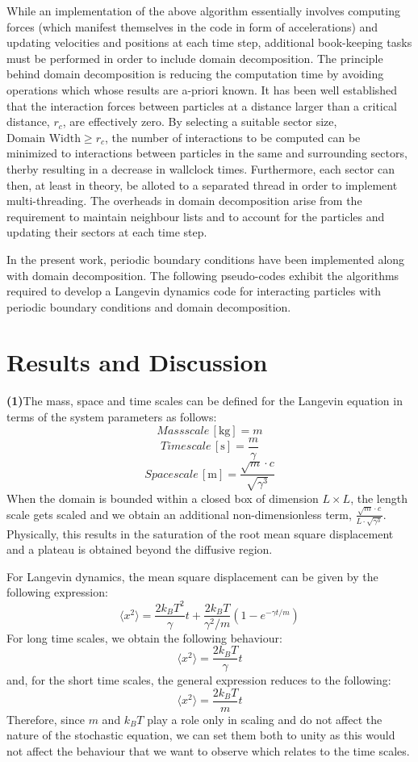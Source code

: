 \documentclass[11pt, oneside]{article}
\begin{document}
While an implementation of the above algorithm essentially involves computing forces (which manifest themselves in the code in form of accelerations) and updating velocities and positions at each time step, additional book-keeping tasks must be performed in order to include domain decomposition. The principle behind domain decomposition is reducing the computation time by avoiding operations which whose results are a-priori known. It has been well established that the interaction forces between particles at a distance larger than a critical distance, $r_c$, are effectively zero. By selecting a suitable sector size, $\text{Domain Width} \geq r_c$, the number of interactions to be computed can be minimized to interactions between particles in the same and surrounding sectors, therby resulting in a decrease in wallclock times. Furthermore, each sector can then, at least in theory, be alloted to a separated thread in order to implement multi-threading. The overheads in domain decomposition arise from the requirement to maintain neighbour lists and to account for the particles and updating their sectors at each time step.

In the present work, periodic boundary conditions have been implemented along with domain decomposition. The following pseudo-codes exhibit the algorithms required to develop a Langevin dynamics code for interacting particles with periodic boundary conditions and domain decomposition.


	
\section{Results and Discussion}
\textbf{(1)}\quad The mass, space and time scales can be defined for the  Langevin equation in terms of the system parameters as follows: \[Mass scale \, [\si{\kilo\gram}] = m\]  \[Time scale \, [\si{\second}] = \frac{m}{\gamma}\]  \[Space scale \, [\si{\metre}] = \frac{\sqrt{m}\cdot c}{\sqrt{\gamma^3}}\] When the domain is bounded within a closed box of dimension \(L \times L\), the length scale gets scaled and we obtain an additional non-dimensionless term, \(\frac{\sqrt{m}\cdot c}{L\cdot\sqrt{\gamma^3}}\). Physically, this results in the saturation of the root mean square displacement  and a plateau is obtained beyond the diffusive region.

For Langevin dynamics, the mean square displacement can be given by the following expression:
\begin{equation}
  \langle{x^2}\rangle = \frac{2 k_B T^2}{\gamma} t + \frac{2 k_B T}{\gamma^2/m}(1 - e^{-\gamma t/m})
\end{equation}
For long time scales, we obtain the following behaviour: \[\langle{x^2}\rangle = \frac{2 k_B T}{\gamma} t\] and, for the short time scales, the general expression reduces to the following:  \[\langle{x^2}\rangle = \frac{2 k_B T}{m}t\] Therefore, since \(m\) and \(k_B T\) play a role only in scaling and do not affect the nature of the stochastic equation, we can set them both to unity as this would not affect the behaviour that we want to observe which relates to the time scales.
 
\end{document}
